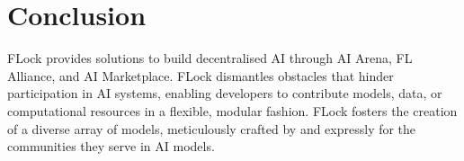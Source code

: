 \documentclass[conference]{IEEEtran}
\newcommand{\FL}{\ac{FL} Alliance\xspace}
\newcommand{\SNT}{{AI Arena}\xspace}
\begin{document}




\section{Conclusion}
FLock provides solutions to build decentralised AI through \SNT, \FL, and AI Marketplace. FLock dismantles obstacles that hinder participation in AI systems, enabling developers to contribute models, data, or computational resources in a flexible, modular fashion. FLock fosters the creation of a diverse array of models, meticulously crafted by and expressly for the communities they serve in AI models.











\end{document}
